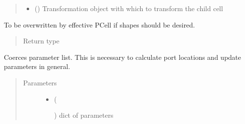 \documentclass[a4paper,10pt,english]{sphinxmanual}
\begin{document}
\begin{fulllineitems}
\begin{fulllineitems}
\begin{quote}
\begin{description}
\begin{itemize}
\item {} 
 () \textendash{} Transformation object with which to transform the child cell

\end{itemize}

\end{description}\end{quote}

\end{fulllineitems}


\begin{fulllineitems}
\label{\detokenize{photonics:kppc.photonics.PhotDevice.shapes}}
To be overwritten by effective PCell if shapes should be desired.
\begin{quote}\begin{description}
\item[{Return type}] \leavevmode
{}%
\begin{footnote}[61]\sphinxAtStartFootnote
{}
%
\end{footnote}

\end{description}\end{quote}

\end{fulllineitems}


\begin{fulllineitems}
\label{\detokenize{photonics:kppc.photonics.PhotDevice.update_parameter_list}}
Coerces parameter list. This is necessary to calculate port locations and update parameters in general.
\begin{quote}\begin{description}
\item[{Parameters}] \leavevmode\begin{itemize}
\item {} 
 (%
\begin{footnote}[62]\sphinxAtStartFootnote
{}
%
\end{footnote}) \textendash{} dict of parameters


\end{itemize}
\end{description}
\end{quote}
\end{fulllineitems}
\end{fulllineitems}
\end{document}
